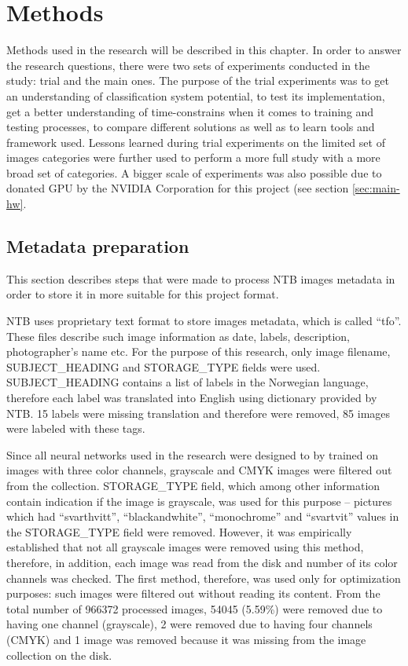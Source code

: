 \chapter{Methods}
\label{chap:methods}

Methods used in the research will be described in this chapter. In order to answer the research questions, there were two sets of experiments conducted in the study: trial and the main ones. The purpose of the trial experiments was to get an understanding of classification system potential, to test its implementation, get a better understanding of time-constrains when it comes to training and testing processes, to compare different solutions as well as to learn tools and framework used. Lessons learned during trial experiments on the limited set of images categories were further used to perform a more full study with a more broad set of categories. A bigger scale of experiments was also possible due to donated GPU by the NVIDIA Corporation for this project (see section \ref{sec:main-hw}.


\section{Metadata preparation}
\label{sec:metadata-prep}
This section describes steps that were made to process NTB images metadata in order to store it in more suitable for this project format.

NTB uses proprietary text format to store images metadata, which is called ``tfo''. These files describe such image information as date, labels, description, photographer's name etc. For the purpose of this research, only image filename, SUBJECT\_HEADING and STORAGE\_TYPE fields were used. SUBJECT\_HEADING contains a list of labels in the Norwegian language, therefore each label was translated into English using dictionary provided by NTB. 15 labels were missing translation and therefore were removed, 85 images were labeled with these tags.

Since all neural networks used in the research were designed to by trained on images with three color channels, grayscale and CMYK images were filtered out from the collection. STORAGE\_TYPE field, which among other information contain indication if the image is grayscale, was used for this purpose -- pictures which had ``svarthvitt'', ``blackandwhite'', ``monochrome'' and ``svartvit'' values in the STORAGE\_TYPE field were removed. However, it was empirically established that not all grayscale images were removed using this method, therefore, in addition, each image was read from the disk and number of its color channels was checked. The first method, therefore, was used only for optimization purposes: such images were filtered out without reading its content. From the total number of 966372 processed images, 54045 (5.59\%) were removed due to having one channel (grayscale), 2 were removed due to having four channels (CMYK) and 1 image was removed because it was missing from the image collection on the disk.

